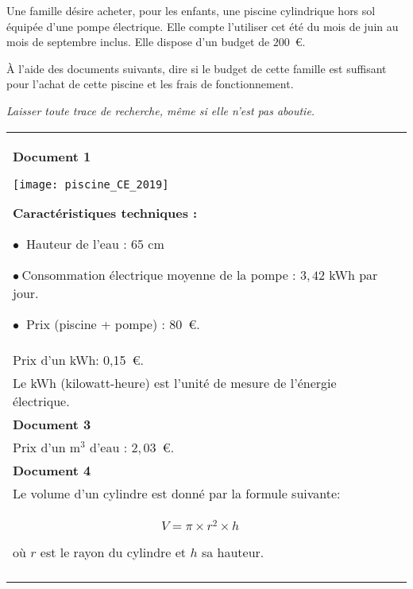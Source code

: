 
\medskip

Une famille désire acheter, pour les enfants, une piscine cylindrique hors sol équipée d'une pompe électrique. Elle compte l'utiliser cet été du mois de juin au mois de septembre inclus. Elle dispose d'un budget de $200$~\euro.

À l'aide des documents suivants, dire si le budget de cette famille est suffisant pour l'achat de cette piscine et les frais de fonctionnement.

\emph{Laisser toute trace de recherche, même si elle n'est pas aboutie.}

\medskip

\begin{tabularx}{\linewidth}{|X|m{5.8cm}|}\hline
\textbf{Document 1}

\texttt{[image: piscine\_CE\_2019]}

\medskip

\textbf{Caractéristiques techniques :}

$\bullet~$ Hauteur de l'eau : $65$ cm

$\bullet~$Consommation électrique moyenne de la pompe :
$3,42$ kWh par jour.

$\bullet~$ Prix (piscine + pompe) : $80$~\euro.&\begin{tabular}{m{5.6cm}}\hline

\textbf{Document 2}\\

Prix d'un kWh: 0,15~\euro.\\

Le kWh (kilowatt-heure) est l'unité de mesure de l'énergie électrique.\\ \hline
\textbf{Document 3}\\

Prix d'un m$^3$ d'eau : $2,03$~\euro.\\ \hline
\textbf{Document 4}\\

Le volume d'un cylindre est donné par la formule suivante:\\

\[V = \pi \times  r^2 \times h\]

où $r$ est le rayon du cylindre et $h$ sa hauteur.\\ 
\end{tabular}\\ \hline
\end{tabularx}


